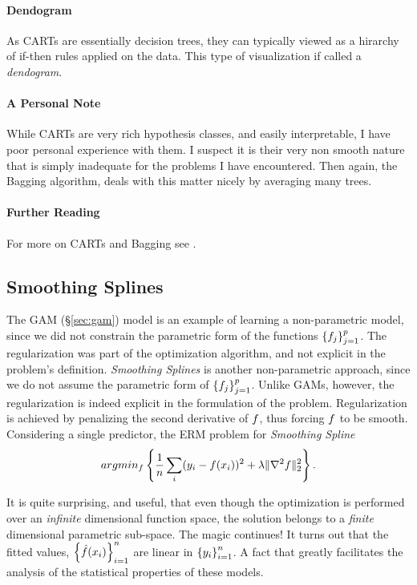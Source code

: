 \paragraph{Dendogram}
As CARTs are essentially decision trees, they can typically viewed as a hirarchy of if-then rules applied on the data.
This type of visualization if called a \emph{dendogram}.

\paragraph{A Personal Note}
While CARTs are very rich hypothesis classes, and easily interpretable, I have poor personal experience with them. 
I suspect it is their very non smooth nature that is simply inadequate for the problems I have encountered.
Then again, the Bagging algorithm, deals with this matter nicely by averaging many trees.


\paragraph{Further Reading}
For more on CARTs and Bagging see \citep[Section 9]{hastie_elements_2003}.



\subsection{Smoothing Splines}
\label{sec:smoothing_splines}
The GAM (\S\ref{sec:gam}) model is an example of learning a non-parametric model, since we did not constrain the parametric form of the functions $\left\{ f_j \right\}_{j=1}^p$. The regularization was part of the optimization algorithm, and not explicit in the problem's definition.
\emph{Smoothing Splines} is another non-parametric approach, since we do not assume the parametric form of $\left\{ f_j \right\}_{j=1}^p$. 
Unlike GAMs, however, the regularization is indeed explicit in the formulation of the problem. 
Regularization is achieved by penalizing the second derivative of $f$, thus forcing $f$ to be smooth. 
Considering a single predictor, the ERM problem for \emph{Smoothing Spline}
\begin{align}
\label{eq:smoothing_spline}
	 argmin_{f}\left\{ \frac{1}{n}\sum_i (y_i-f(x_i))^2 + \lambda \Vert \nabla^2 f \Vert_2^2   \right\}.
\end{align}

It is quite surprising, and useful, that even though the optimization is performed over an \emph{infinite} dimensional function space, the solution belongs to a \emph{finite } dimensional parametric sub-space. 
The magic continues! It turns out that the fitted values, $\left\{ \hat{f}(x_i) \right\}_{i=1}^n$ are linear in $\left\{ y_i \right\}_{i=1}^n$. A fact that greatly facilitates the analysis of the statistical properties of these models.

